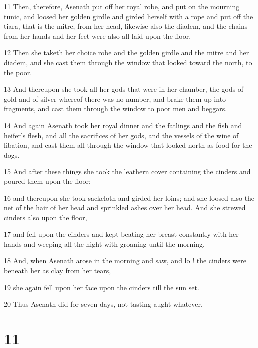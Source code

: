 \par 11 Then, therefore, Asenath put off her royal robe, and put on the mourning tunic, and loosed her golden girdle and girded herself with a rope and put off the tiara, that is the mitre, from her head, likewise also the diadem, and the chains from her hands and her feet were also all laid upon the floor. 

\par 12 Then she taketh her choice robe and the golden girdle and the mitre and her diadem, and she cast them through the window that looked toward the north, to the poor. 

\par 13 And thereupon she took all her gods that were in her chamber, the gods of gold and of silver whereof there was no number, and brake them up into fragments, and cast them through the window to poor men and beggars. 

\par 14 And again Asenath took her royal dinner and the fatlings and the fish and heifer's flesh, and all the sacrifices of her gods, and the vessels of the wine of libation, and cast them all through the window that looked north as food for the dogs. 

\par 15 And after these things she took the leathern cover containing the cinders and poured them upon the floor; 

\par 16 and thereupon she took sackcloth and girded her loins; and she loosed also the net of the hair of her head and sprinkled ashes over her head. And she strewed cinders also upon the floor, 

\par 17 and fell upon the cinders and kept beating her breast constantly with her hands and weeping all the night with groaning until the morning. 

\par 18 And, when Asenath arose in the morning and saw, and lo ! the cinders were beneath her as clay from her tears, 

\par 19 she again fell upon her face upon the cinders till the sun set. 

\par 20 Thus Asenath did for seven days, not tasting aught whatever. 

\chapter{11}

